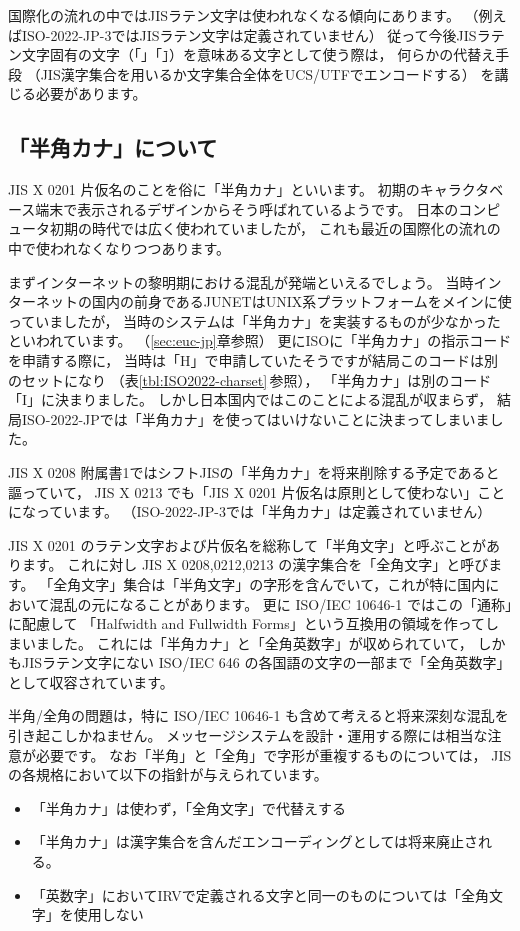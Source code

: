 \documentclass[a4j,10pt,fleqn,uplatex]{jsarticle}
\begin{document}
国際化の流れの中ではJISラテン文字は使われなくなる傾向にあります。
（例えばISO-2022-JP-3ではJISラテン文字は定義されていません）
従って今後JISラテン文字固有の文字（「\texttt{\yen}」「\texttt{\={}}」）を意味ある文字として使う際は，
何らかの代替え手段
（JIS漢字集合を用いるか文字集合全体をUCS/UTFでエンコードする）
を講じる必要があります。


\subsection{「半角カナ」について} \label{sec:zen-han}

JIS X 0201 片仮名のことを俗に「半角カナ」といいます。
初期のキャラクタベース端末で表示されるデザインからそう呼ばれているようです。
日本のコンピュータ初期の時代では広く使われていましたが，
これも最近の国際化の流れの中で使われなくなりつつあります。

まずインターネットの黎明期における混乱が発端といえるでしょう。
当時インターネットの国内の前身であるJUNETはUNIX系プラットフォームをメインに使っていましたが，
当時のシステムは「半角カナ」を実装するものが少なかったといわれています。
（\ref{sec:euc-jp}章参照）
更にISOに「半角カナ」の指示コードを申請する際に，
当時は「H」で申請していたそうですが結局このコードは別のセットになり
（表\ref{tbl:ISO2022-charset}\,参照），
「半角カナ」は別のコード「I」に決まりました。
しかし日本国内ではこのことによる混乱が収まらず，
結局ISO-2022-JPでは「半角カナ」を使ってはいけないことに決まってしまいました。

JIS X 0208 附属書1ではシフトJISの「半角カナ」を将来削除する予定であると謳っていて，
JIS X 0213 でも「JIS X 0201 片仮名は原則として使わない」ことになっています。
（ISO-2022-JP-3では「半角カナ」は定義されていません）

JIS X 0201 のラテン文字および片仮名を総称して「半角文字」と呼ぶことがあります。
これに対し JIS X 0208,0212,0213 の漢字集合を「全角文字」と呼びます。
「全角文字」集合は「半角文字」の字形を含んでいて，これが特に国内において混乱の元になることがあります。
更に ISO/IEC 10646-1 ではこの「通称」に配慮して
「Halfwidth and Fullwidth Forms」という互換用の領域を作ってしまいました。
これには「半角カナ」と「全角英数字」が収められていて，
しかもJISラテン文字にない ISO/IEC 646 の各国語の文字の一部まで「全角英数字」として収容されています。

半角/全角の問題は，特に ISO/IEC 10646-1 も含めて考えると将来深刻な混乱を引き起こしかねません。
メッセージシステムを設計・運用する際には相当な注意が必要です。
なお「半角」と「全角」で字形が重複するものについては，
JISの各規格において以下の指針が与えられています。
\begin{itemize}
\item 「半角カナ」は使わず，「全角文字」で代替えする
\item 「半角カナ」は漢字集合を含んだエンコーディングとしては将来廃止される。
\item 「英数字」においてIRVで定義される文字と同一のものについては「全角文字」を使用しない
\end{itemize}
\end{document}
